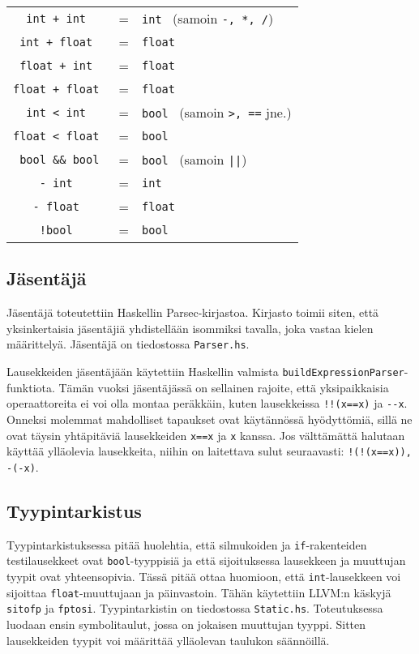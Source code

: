 \documentclass[12pt]{article}
\newcommand{\code}{\texttt}
\begin{document}
\begin{tabular}{ccl}
\code{int + int     }& = & \code{int  } (samoin \code{-, *, /})\\
\code{int + float   }& = & \code{float} \\
\code{float + int   }& = & \code{float} \\
\code{float + float }& = & \code{float} \\
\code{int < int     }& = & \code{bool } (samoin \code{>, ==} jne.)\\
\code{float < float }& = & \code{bool }\\
\code{bool \&\& bool}& = & \code{bool } (samoin \code{||})\\
\code{- int         }& = & \code{int  }\\
\code{- float       }& = & \code{float} \\
\code{!bool         }& = & \code{bool }\\
\end{tabular} 

\subsection{Jäsentäjä}\label{kuva}
Jäsentäjä toteutettiin Haskellin Parsec-kirjastoa. Kirjasto toimii siten, että 
yksin\-kertaisia jäsentäjiä yhdistellään isommiksi tavalla, joka vastaa kielen 
määrittelyä. Jäsentäjä on tiedostossa \code{Parser.hs}.

Lausekkeiden jäsentäjään käytettiin Haskellin valmista 
\code{buildExpressionParser}-funktiota. Tämän vuoksi jäsentäjässä on sellainen
rajoite, että yksipaikkaisia operaattoreita ei voi olla montaa peräkkäin, 
kuten lausekkeissa \code{!!(x==x)} ja \code{-{}-x}. Onneksi molemmat mahdolliset 
tapaukset ovat käytännössä hyödyttömiä, sillä ne ovat täysin yhtäpitäviä 
lausekkeiden \code{x==x} ja \code{x} kanssa. Jos välttämättä halutaan käyttää 
ylläolevia lausekkeita, niihin on laitettava sulut seuraavasti: \code{!(!(x==x)), -(-x)}.

\subsection{Tyypintarkistus}
Tyypintarkistuksessa pitää huolehtia, että silmukoiden ja \code{if}-rakenteiden 
testilausekkeet ovat \code{bool}-tyyppisiä ja että sijoituksessa lausekkeen ja 
muuttujan tyypit ovat yhteensopivia. Tässä pitää ottaa huomioon, että \code{int}-lausekkeen
voi sijoittaa \code{float}-muuttujaan ja päinvastoin. Tähän käytettiin LLVM:n 
käskyjä \code{sitofp} ja \code{fptosi}. Tyypintarkistin on tiedostossa \code{Static.hs}.
Toteutuksessa luo\-daan ensin symbolitaulut, jossa on jokaisen muuttujan tyyppi. 
Sitten lausekkeiden tyypit voi määrittää ylläolevan taulukon säännöillä.
\end{document}
